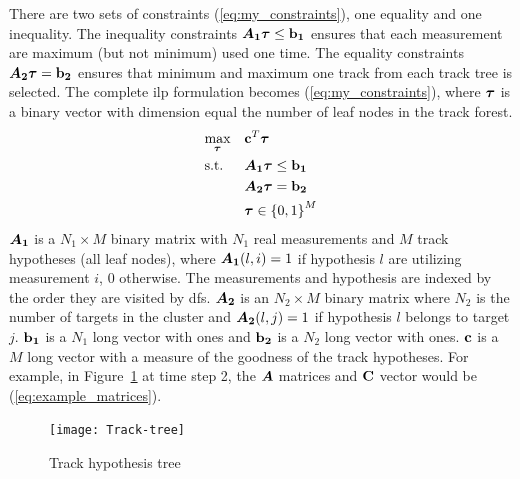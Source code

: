 There are two sets of constraints (\ref{eq:my_constraints}), one equality and one inequality. The inequality constraints \(\bm{A_1} \boldsymbol{\mathbf{\tau}} \leq \boldsymbol{\mathbf{b_1}}\) ensures that each measurement are maximum (but not minimum) used one time. The equality constraints \(\bm{A_2} \boldsymbol{\mathbf{\tau}} = \boldsymbol{\mathbf{b_2}}\) ensures that minimum and maximum one track from each track tree is selected. The complete \gls{ilp} formulation becomes (\ref{eq:my_constraints}), where \(\boldsymbol{\mathbf{\tau}}\) is a binary vector with dimension equal the number of leaf nodes in the track forest.
\begin{equation}
\begin{aligned}
&	\underset{\boldsymbol{\mathbf{\tau}}}{\text{max}}
&&	\boldsymbol{\mathbf{c}}^T \boldsymbol{\mathbf{\tau}} \\
&	\text{s.t.}
&&	\bm{A_1} \boldsymbol{\mathbf{\tau}} \leq \boldsymbol{\mathbf{b_1}} 	\\
&&&	\bm{A_2} \boldsymbol{\mathbf{\tau}} = \boldsymbol{\mathbf{b_2}}	\\
&&&	\boldsymbol{\mathbf{\tau}} \in {\{0,1\}}^{M}
\end{aligned}
\label{eq:my_constraints}
\end{equation}
\(\bm{A_1}\) is a \(N_1 \times M\) binary matrix with \(N_1\) real measurements and \(M\) track hypotheses (all leaf nodes), where \(\bm{A_1}(l,i)=1\) if hypothesis \(l\) are utilizing measurement \(i\), \(0\) otherwise. The measurements and hypothesis are indexed by the order they are visited by \gls{dfs}. \(\bm{A_2}\) is an \(N_2 \times M\) binary matrix where \(N_2\) is the number of targets in the cluster and \(\bm{A_2}(l,j)=1\) if hypothesis \(l\) belongs to target \(j\). \(\boldsymbol{\mathbf{b_1}}\) is a \(N_1\) long vector with ones and \(\boldsymbol{\mathbf{b_2}}\) is a \(N_2\) long vector with ones. \(\boldsymbol{\mathbf{c}}\) is a \(M\) long vector with a measure of the goodness of the track hypotheses. For example, in Figure~\ref{fig:hyp-tree} at time step 2, the \(\bm{A}\) matrices and \(\boldsymbol{\mathbf{C}}\) vector would be (\ref{eq:example_matrices}).
\begin{figure}[H]
\centering
\texttt{[image: Track-tree]}
\caption{Track hypothesis tree}\label{fig:hyp-tree}
\end{figure}

